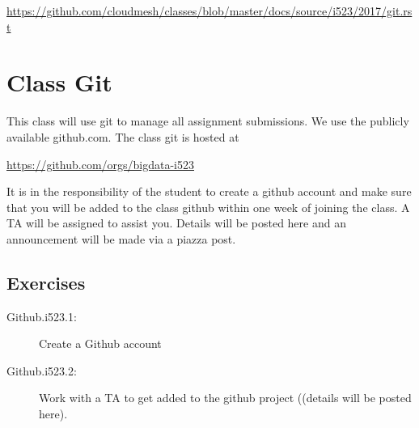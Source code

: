 \begin{fileremark}\url{https://github.com/cloudmesh/classes/blob/master/docs/source/i523/2017/git.rst}\end{fileremark}
\section{Class Git}\label{class-git}

This class will use git to manage all assignment submissions. We use the
publicly available github.com. The class git is hosted at

\url{https://github.com/orgs/bigdata-i523}

It is in the responsibility of the student to create a github account
and make sure that you will be added to the class github within one week
of joining the class. A TA will be assigned to assist you. Details will
be posted here and an announcement will be made via a piazza post.

\subsection{Exercises}\label{exercises}

\begin{description}
\item[Github.i523.1:]
Create a Github account
\item[Github.i523.2:]
Work with a TA to get added to the github project ((details will be
posted here).
\end{description}
